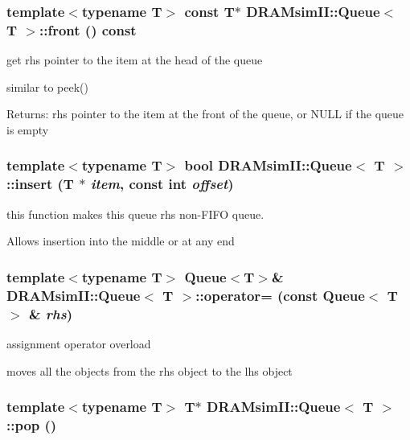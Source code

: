 \subsubsection[{front}]{\setlength{\rightskip}{0pt plus 5cm}template$<$typename T$>$ const T$\ast$ {\bf DRAMsimII::Queue}$<$ T $>$::front () const\hspace{0.3cm}{\tt  [inline]}}\label{class_d_r_a_msim_i_i_1_1_queue_850213fe5d31d3b2f6edc194d6e72b3d}


get rhs pointer to the item at the head of the queue 

similar to peek() \begin{Desc}
\item[Returns:]rhs pointer to the item at the front of the queue, or NULL if the queue is empty \end{Desc}
\subsubsection[{insert}]{\setlength{\rightskip}{0pt plus 5cm}template$<$typename T$>$ bool {\bf DRAMsimII::Queue}$<$ T $>$::insert (T $\ast$ {\em item}, \/  const int {\em offset})\hspace{0.3cm}{\tt  [inline]}}\label{class_d_r_a_msim_i_i_1_1_queue_6b51d06f571c13b2e81a0c51623ba54d}


this function makes this queue rhs non-FIFO queue. 

Allows insertion into the middle or at any end 
\subsubsection[{operator=}]{\setlength{\rightskip}{0pt plus 5cm}template$<$typename T$>$ {\bf Queue}$<$T$>$\& {\bf DRAMsimII::Queue}$<$ T $>$::operator= (const {\bf Queue}$<$ T $>$ \& {\em rhs})\hspace{0.3cm}{\tt  [inline]}}\label{class_d_r_a_msim_i_i_1_1_queue_d108e491b4d2b5eed585f22cba0d66e5}


assignment operator overload 

moves all the objects from the rhs object to the lhs object 
\subsubsection[{pop}]{\setlength{\rightskip}{0pt plus 5cm}template$<$typename T$>$ T$\ast$ {\bf DRAMsimII::Queue}$<$ T $>$::pop ()\hspace{0.3cm}{\tt  [inline]}}\label{class_d_r_a_msim_i_i_1_1_queue_f25337ce05c231a10809f6b3f3344e4d}



